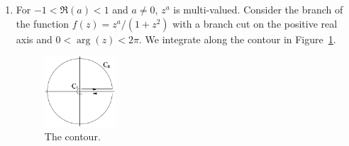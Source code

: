 {\begin{Solution}
\begin{enumerate}
    Next we work with the integral on $(1 \ldots \infty)$.
    \begin{align*}
      \left| \int_1^\infty \frac{x^a}{1+x^2}\,\dd x \right|
      &\leq \int_1^\infty \left| \frac{x^a}{1+x^2} \right|
       \left| d x \right| \\
      &= \int_1^\infty \frac{x^{\Re(a)}}{1+x^2} \,\dd x \\
      &\leq \int_1^\infty x^{\Re(a) - 2} \,\dd x
    \end{align*}
    This integral converges for $\Re(a) < 1$.

    Thus we see that the integral defining $I(a)$ converges in the
    strip,  $-1 < \Re(a) < 1$.  The integral converges uniformly in any closed
    subset of this domain.  Uniform convergence means that we can differentiate
    the integral with respect to $a$ and interchange the order of
    integration and differentiation.
    \[
    I'(a) = \int_0^\infty \frac{x^a \log x}{1+x^2}\,\dd x
    \]
    Thus we see that $I(a)$ is analytic for $-1 < \Re(a) < 1$.
  \item
    For $-1 < \Re(a) < 1$ and $a \neq 0$, $z^a$ is multi-valued.
    Consider the branch of the function $f(z) = z^a / (1 + z^2)$ with a
    branch cut on the positive real axis and $0 < \arg(z) < 2 \pi$.
    We integrate along the contour in Figure~\ref{contepsr za 1+z2}.

    \begin{figure}[tb!]
      \begin{center}
        \includegraphics[width=0.25\textwidth]{fcv/residue/contepsr}
      \end{center}
      \caption{The contour.}
      \label{contepsr za 1+z2}
    \end{figure}


\end{enumerate}
\end{Solution}}
